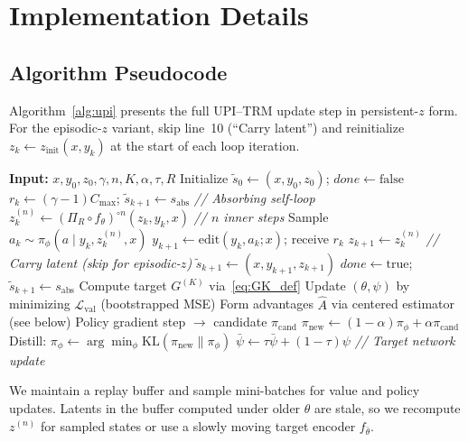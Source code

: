 \documentclass{article}
\theoremstyle{plain}
\theoremstyle{definition}
\theoremstyle{remark}
\newcommand{\KL}{\mathrm{KL}}
\begin{document}
\section{Implementation Details}
\label{app:implementation}


\subsection{Algorithm Pseudocode}
\label{app:algorithm_pseudocode}

Algorithm~\ref{alg:upi} presents the full UPI--TRM update step in persistent-$z$ form.
For the episodic-$z$ variant, skip line~10 (``Carry latent'') and reinitialize $z_k \gets z_{\mathrm{init}}(x,y_k)$ at the start of each loop iteration.

\begin{algorithm}[h]
\small
\caption{UPI--TRM: single interaction + update step}
\label{alg:upi_app}
\begin{algorithmic}[1]
\STATE \textbf{Input:} $x, y_0, z_0, \gamma, n, K, \alpha, \tau, R$
\STATE Initialize $\tilde{s}_0 \gets (x,y_0,z_0)$; $\mathit{done} \gets \mathrm{false}$
    \STATE $r_k \gets (\gamma-1)C_{\max}$; $\tilde{s}_{k+1} \gets s_{\mathrm{abs}}$ \hfill \emph{// Absorbing self-loop}
  \ELSE
    \STATE $z_k^{(n)} \gets (\Pi_R \circ f_\theta)^{\circ n}(z_k,y_k,x)$ \hfill \emph{// $n$ inner steps}
    \STATE Sample $a_k \sim \pi_{\phi}(a \mid y_k,z_k^{(n)},x)$
    \STATE $y_{k+1} \gets \mathrm{edit}(y_k,a_k;x)$; receive $r_k$
    \STATE $z_{k+1} \gets z_k^{(n)}$ \hfill \emph{// Carry latent (skip for episodic-$z$)}
    \STATE $\tilde{s}_{k+1} \gets (x,y_{k+1},z_{k+1})$
     \STATE $\mathit{done} \gets \mathrm{true}$; $\tilde{s}_{k+1} \gets s_{\mathrm{abs}}$
    \ENDIF
  \ENDIF
\ENDFOR
\STATE Compute target $G^{(K)}$ via~\eqref{eq:GK_def}
\STATE Update $(\theta,\psi)$ by minimizing $\mathcal{L}_{\mathrm{val}}$ (bootstrapped MSE)
\STATE Form advantages $\widehat A$ via centered estimator (see below)
\STATE Policy gradient step $\to$ candidate $\pi_{\mathrm{cand}}$
\STATE $\pi_{\mathrm{new}} \gets (1-\alpha)\pi_{\phi} + \alpha\pi_{\mathrm{cand}}$
\STATE Distill: $\pi_\phi \gets \arg\min_\phi \KL(\pi_{\mathrm{new}} \| \pi_\phi)$
\STATE $\bar\psi \gets \tau \bar\psi + (1-\tau)\psi$ \hfill \emph{// Target network update}
\end{algorithmic}
\end{algorithm}


We maintain a replay buffer and sample mini-batches for value and policy updates. Latents in the buffer computed under older $\theta$ are stale, so we recompute $z^{(n)}$ for sampled states or use a slowly moving target encoder $f_{\bar\theta}$.
\end{document}
